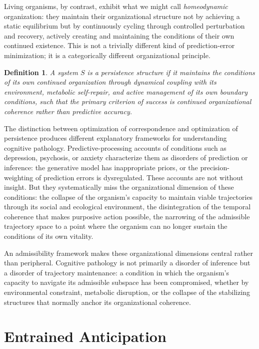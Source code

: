 \documentclass[12pt,a4paper]{report}
\theoremstyle{flyxion}
\newtheorem{definition}[theorem]{Definition}
\begin{document}
Living organisms, by contrast, exhibit what we might call \emph{homeodynamic} organization: they maintain their organizational structure not by achieving a static equilibrium but by continuously cycling through controlled perturbation and recovery, actively creating and maintaining the conditions of their own continued existence. This is not a trivially different kind of prediction-error minimization; it is a categorically different organizational principle.

\begin{definition}
A system $S$ is a \emph{persistence structure} if it maintains the conditions of its own continued organization through dynamical coupling with its environment, metabolic self-repair, and active management of its own boundary conditions, such that the primary criterion of success is continued organizational coherence rather than predictive accuracy.
\end{definition}

The distinction between optimization of correspondence and optimization of persistence produces different explanatory frameworks for understanding cognitive pathology. Predictive-processing accounts of conditions such as depression, psychosis, or anxiety characterize them as disorders of prediction or inference: the generative model has inappropriate priors, or the precision-weighting of prediction errors is dysregulated. These accounts are not without insight. But they systematically miss the organizational dimension of these conditions: the collapse of the organism's capacity to maintain viable trajectories through its social and ecological environment, the disintegration of the temporal coherence that makes purposive action possible, the narrowing of the admissible trajectory space to a point where the organism can no longer sustain the conditions of its own vitality.

An admissibility framework makes these organizational dimensions central rather than peripheral. Cognitive pathology is not primarily a disorder of inference but a disorder of trajectory maintenance: a condition in which the organism's capacity to navigate its admissible subspace has been compromised, whether by environmental constraint, metabolic disruption, or the collapse of the stabilizing structures that normally anchor its organizational coherence.

\section{Entrained Anticipation}
\end{document}
